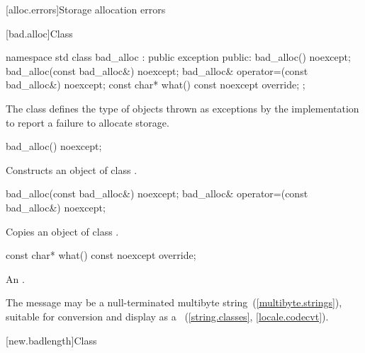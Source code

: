 [alloc.errors]{Storage allocation errors}

%
[bad.alloc]{Class }

\begin{codeblock}
namespace std {
  class bad_alloc : public exception {
  public:
    bad_alloc() noexcept;
    bad_alloc(const bad_alloc&) noexcept;
    bad_alloc& operator=(const bad_alloc&) noexcept;
    const char* what() const noexcept override;
  };
}
\end{codeblock}

\pnum
The class
defines the type of objects thrown as
exceptions by the implementation to report a failure to allocate storage.

%
\begin{itemdecl}
bad_alloc() noexcept;
\end{itemdecl}

\begin{itemdescr}
\pnum
\effects
Constructs an object of class
.
\end{itemdescr}

%
%
\begin{itemdecl}
bad_alloc(const bad_alloc&) noexcept;
bad_alloc& operator=(const bad_alloc&) noexcept;
\end{itemdecl}

\begin{itemdescr}
\pnum
\effects
Copies an object of class
.
\end{itemdescr}

%
%
\begin{itemdecl}
const char* what() const noexcept override;
\end{itemdecl}

\begin{itemdescr}
\pnum
\returns
An  \ntbs.

\pnum
\remarks
The message may be a null-terminated multibyte string~(\ref{multibyte.strings}),
suitable for conversion and display as a
~(\ref{string.classes}, \ref{locale.codecvt}).
\end{itemdescr}

%
[new.badlength]{Class }

